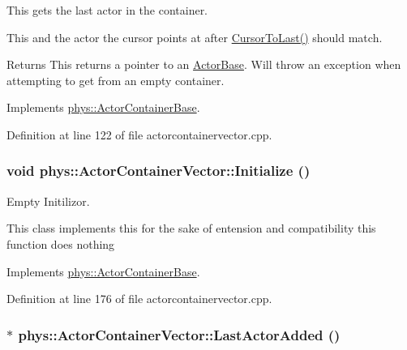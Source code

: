 This gets the last actor in the container. 

This and the actor the cursor points at after \hyperlink{classphys_1_1ActorContainerVector_aa6b08266bbb57a22c07ab50514e58db4}{CursorToLast()} should match. \begin{DoxyReturn}{Returns}
This returns a pointer to an \hyperlink{classphys_1_1ActorBase}{ActorBase}. Will throw an exception when attempting to get from an empty container. 
\end{DoxyReturn}


Implements \hyperlink{classphys_1_1ActorContainerBase_a8efeffd5ae22085fe01af791b3ea559e}{phys::ActorContainerBase}.



Definition at line 122 of file actorcontainervector.cpp.

\hypertarget{classphys_1_1ActorContainerVector_adcebf4329a587669f74e1eacc1e6912c}{
\subsubsection[{Initialize}]{\setlength{\rightskip}{0pt plus 5cm}void phys::ActorContainerVector::Initialize ()}}
\label{d3/d64/classphys_1_1ActorContainerVector_adcebf4329a587669f74e1eacc1e6912c}


Empty Initilizor. 

This class implements this for the sake of entension and compatibility this function does nothing 

Implements \hyperlink{classphys_1_1ActorContainerBase_af36d5866e0ee9f6f450a4e62642e0928}{phys::ActorContainerBase}.



Definition at line 176 of file actorcontainervector.cpp.

\hypertarget{classphys_1_1ActorContainerVector_a49e643bdeff78521de9c4a9fea59a0d2}{
\subsubsection[{LastActorAdded}]{ $\ast$ phys::ActorContainerVector::LastActorAdded ()}}
\label{d3/d64/classphys_1_1ActorContainerVector_a49e643bdeff78521de9c4a9fea59a0d2}



